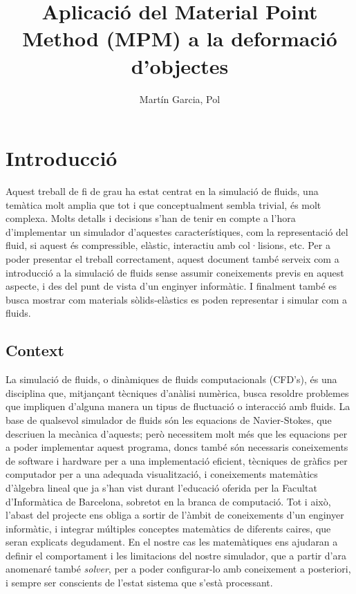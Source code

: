 \documentclass[a4paper]{report}
\title{Aplicació del Material Point Method (MPM) a la deformació d'objectes}
\author{Martín Garcia, Pol}
\date{\parbox{\linewidth}{\centering%
		\today\endgraf\bigskip
		Director: Susín Sánchez, Toni\endgraf \medskip
		Especialitat Computació \endgraf
		Facultat d'Informàtica de Barcelona}}
\begin{document}
	\maketitle
	\newpage
	

	
	\tableofcontents
	\newpage
	
	
	\chapter{Introducció}
	Aquest treball de fi de grau ha estat centrat en la simulació de fluids, una temàtica molt amplia que tot i que conceptualment sembla trivial, és molt complexa. Molts detalls i decisions s'han de tenir en compte a l'hora d'implementar un simulador d'aquestes característiques, com la representació del fluid, si aquest és compressible, elàstic, interactiu amb col·lisions, etc. \newline
	Per a poder presentar el treball correctament, aquest document també serveix com a introducció a la simulació de fluids sense assumir coneixements previs en aquest aspecte, i des del punt de vista d'un enginyer informàtic.\newline
	I finalment també es busca mostrar com materials sòlids-elàstics es poden representar i simular com a fluids.\newline

	\section{Context}
	La simulació de fluids, o dinàmiques de fluids computacionals (CFD's), és una disciplina que, mitjançant tècniques d'anàlisi numèrica, busca resoldre problemes que impliquen d'alguna manera un tipus de fluctuació o interacció amb fluids. \newline
	La base de qualsevol simulador de fluids són les equacions de Navier-Stokes, que descriuen la mecànica d'aquests; però necessitem molt més que les equacions per a poder implementar aquest programa, doncs també són necessaris coneixements de software i hardware per a una implementació eficient, tècniques de gràfics per computador per a una adequada visualització, i coneixements matemàtics d'àlgebra lineal que ja s'han vist durant l'educació oferida per la Facultat d'Informàtica de Barcelona, sobretot en la branca de computació. Tot i això, l'abast del projecte ens obliga a sortir de l'àmbit de coneixements d'un enginyer informàtic, i integrar múltiples conceptes matemàtics de diferents caires, que seran explicats degudament. \newline
	En el nostre cas les matemàtiques ens ajudaran a definir el comportament i les limitacions del nostre simulador, que a partir d'ara anomenaré també \textit{solver}, per a poder configurar-lo amb coneixement a posteriori, i sempre ser conscients de l'estat sistema que s'està processant. \newline
	
\end{document}
